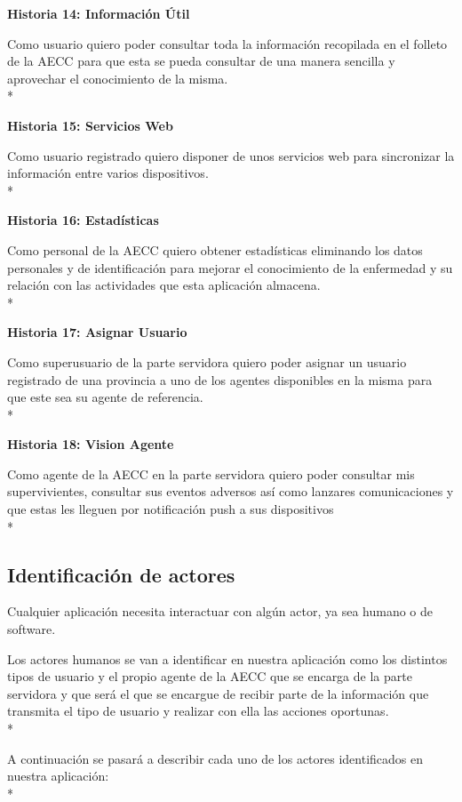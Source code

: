 \documentclass[../pfc.tex]{subfiles}
\begin{document}
	
	\textbf{Historia 14: Información Útil}
	
		Como usuario quiero poder consultar toda la información recopilada en el folleto de la AECC para que esta se pueda consultar de una manera sencilla y aprovechar el conocimiento de la misma.\\*
	
	
	\textbf{Historia 15: Servicios Web}
	
		Como usuario registrado quiero disponer de unos servicios web para sincronizar la información entre varios dispositivos.\\*
	
	
	\textbf{Historia 16: Estadísticas}
	
		Como personal de la AECC quiero obtener estadísticas eliminando los datos personales y de identificación para mejorar el conocimiento de la enfermedad y su relación con las actividades que esta aplicación almacena.\\*
	
	
	\textbf{Historia 17: Asignar Usuario}
	
		Como superusuario de la parte servidora quiero poder asignar un usuario registrado de una provincia a uno de los agentes disponibles en la misma para que este sea su agente de referencia.\\*


	\textbf{Historia 18: Vision Agente}
	
		Como agente de la AECC en la parte servidora quiero poder consultar mis supervivientes, consultar sus eventos adversos así como lanzares comunicaciones y que estas les lleguen por notificación push a sus dispositivos\\*
		

	\subsection{Identificación de actores}
	
	Cualquier aplicación necesita interactuar con algún actor, ya sea humano o de software.
	
	Los actores humanos se van a identificar en nuestra aplicación como los distintos tipos de usuario y el propio agente de la AECC que se encarga de la parte servidora y que será el que se encargue de recibir parte de la información que transmita el tipo de usuario y realizar con ella las acciones oportunas.\\*
	
	A continuación se pasará a describir cada uno de los actores identificados en nuestra aplicación:\\*
	
\end{document}
